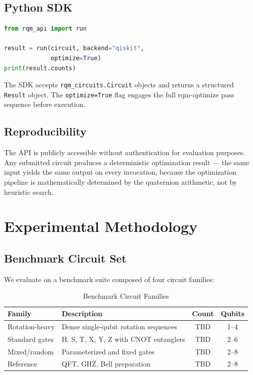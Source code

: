 \documentclass[conference]{IEEEtran}
\begin{document}
\subsection{Python SDK}

\begin{lstlisting}[language=Python]
from rqm_api import run

result = run(circuit, backend="qiskit",
             optimize=True)
print(result.counts)
\end{lstlisting}

The SDK accepts \texttt{rqm\_circuits.Circuit} objects and returns a structured
\texttt{Result} object. The \texttt{optimize=True} flag engages the full rqm-optimize pass
sequence before execution.

\subsection{Reproducibility}

The API is publicly accessible without authentication for evaluation purposes. Any submitted
circuit produces a deterministic optimization result --- the same input yields the same output
on every invocation, because the optimization pipeline is mathematically determined by the
quaternion arithmetic, not by heuristic search.

\section{Experimental Methodology}

\subsection{Benchmark Circuit Set}

We evaluate on a benchmark suite composed of four circuit families:

\begin{table}[htbp]
\caption{Benchmark Circuit Families}
\begin{center}
\begin{tabular}{p{1.8cm}p{3.0cm}cc}
\toprule
\textbf{Family} & \textbf{Description} & \textbf{Count} & \textbf{Qubits} \\
\midrule
Rotation-heavy & Dense single-qubit rotation sequences & TBD & 1--4 \\
Standard gates & H, S, T, X, Y, Z with CNOT entanglers & TBD & 2--6 \\
Mixed/random & Parameterized and fixed gates & TBD & 2--8 \\
Reference & QFT, GHZ, Bell preparation & TBD & 2--8 \\
\bottomrule
\end{tabular}
\label{tab:benchmarks}
\end{center}
\end{table}
\end{document}
